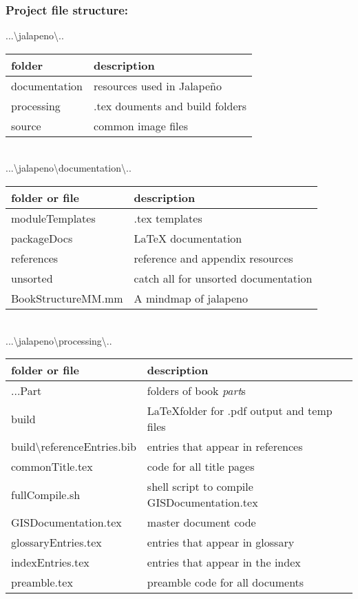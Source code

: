 \documentclass[class=book , crop=false]{standalone}
\begin{document}
\subsubsection{Project file structure:}
{\Large ...\textbackslash jalapeno\textbackslash..}\\
\begin{tabular}{p{4cm}| p{7cm} } 
\footnotesize folder & {\footnotesize description} \\ \hline
documentation & resources used in Jalape\~no\\
processing & .tex douments and build folders\\
source & common image files\\
\end{tabular}
\bigskip\\
{\Large ...\textbackslash jalapeno\textbackslash documentation\textbackslash..}\\
\begin{tabular}{p{4cm} | p{7cm} } 
\footnotesize folder or file & {\footnotesize description} \\ \hline
moduleTemplates & .tex templates\\
packageDocs & \LaTeX{} documentation\\
references & reference and appendix resources\\
unsorted & catch all for unsorted documentation\\
BookStructureMM.mm & A mindmap of jalapeno\\
\end{tabular}
\bigskip\\
{\Large ...\textbackslash jalapeno\textbackslash processing\textbackslash..}\\
\begin{tabular}{p{4cm}| p{7cm} } 
\footnotesize folder or file & {\footnotesize description }\\ \hline
...Part & folders of book \textit{part}s\\
build & \LaTeX{}folder for .pdf output and temp files \\
build\textbackslash referenceEntries.bib & entries that appear in references\\
commonTitle.tex & code for all title pages\\
fullCompile.sh & shell script to compile GISDocumentation.tex\\
GISDocumentation.tex & master document code\\
glossaryEntries.tex & entries that appear in glossary\\
indexEntries.tex & entries that appear in the index\\
preamble.tex & preamble code for all documents\\
\end{tabular}
\end{document}
